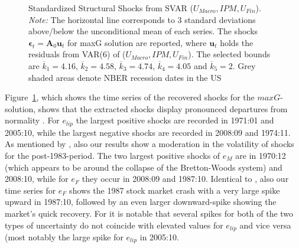 \documentclass[a4paper,11pt,listof=nochaptergap,oneside,pointednumbers,bibtotoc,bigheadings,liststotoc,hidelinks]{scrbook}
\theoremstyle{mysatz}
\theoremstyle{mydefinition}
\theoremstyle{mytheorem}
\theoremstyle{mybemerkung}
\newcommand{\vect}[1]{\boldsymbol{\mathbf{#1}}}
\begin{document}
\begin{figure}[!h]
   \centering
   \setlength\fboxsep{0pt}
   \setlength\fboxrule{0pt}
      \caption[Standardized Structural Shocks from SVAR ($U_{Macro}, IPM, U_{Fin}$).]{Standardized Structural Shocks from SVAR ($U_{Macro}, IPM, U_{Fin}$).\\
      \textit{Note:}  The horizontal line corresponds to 3 standard deviations above/below the unconditional mean of each series. The shocks $\vect{\epsilon}_t = \vect{A}_0\vect{u}_t$ for maxG solution are reported, where $\vect{u}_t$ holds the residuals from VAR(6) of ($U_{Macro}, IPM, U_{Fin}$). The selected bounds are $\overline{k}_1 = 4.16$, $\overline{k}_2 = 4.58$, $\overline{k}_3 = 4.74$, $\overline{k}_4 = 4.05$ and $\overline{k}_5 = 2$. Grey shaded areas denote NBER recession dates in the US}   \label{fig:ludvigsonetal_timeseries_e_shocks}
\end{figure}

Figure~\ref{fig:ludvigsonetal_timeseries_e_shocks}, which shows the time series of the recovered shocks for the $maxG$-solution, shows that the extracted shocks display pronounced departures from normality \citep{ludvigsonetal:19}. For $e_{lip}$ the largest positive shocks are recorded in 1971:01 and 2005:10, while the largest negative shocks are recorded in 2008:09 and 1974:11. As mentioned by \citet{ludvigsonetal:19}, also our results show a moderation in the volatility of shocks for the post-1983-period. The two largest positive shocks of $e_{M}$ are in 1970:12 (which appears to be around the collapse of the Bretton-Woods system) and 2008:10, while for $e_{F}$ they occur in 2008:09 and 1987:10. Identical to \citet{ludvigsonetal:19}, also our time series for $e_{F}$ shows the 1987 stock market crash with a very large spike upward in 1987:10, followed by an even larger downward-spike showing the market's quick recovery. For \citet{ludvigsonetal:19} it is notable that several spikes for both of the two types of uncertainty do not coincide with elevated values for $e_{lip}$ and vice versa (most notably the large spike for $e_{lip}$ in 2005:10.
\end{document}
